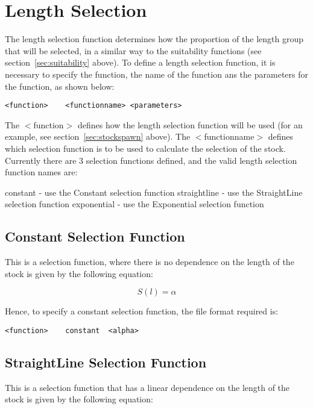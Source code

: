 \documentclass [a4paper, 10pt]{book}
\begin{document}
\section{Length Selection}\label{sec:lselection}
The length selection function determines how the proportion of the length group that will be selected, in a similar way to the suitability functions (see section~\ref{sec:suitability} above).  To define a length selection function, it is necessary to specify the function, the name of the function ans the parameters for the function, as shown below:

{\small\begin{verbatim}
<function>    <functionname> <parameters>
\end{verbatim}}

The $<$function$>$ defines how the length selection function will be used (for an example, see section~\ref{sec:stockspawn} above).  The $<$functionname$>$ defines which selection function is to be used to calculate the selection of the stock.  Currently there are 3 selection functions defined, and the valid length selection function names are:

\bigskip
constant - use the Constant selection function\newline
straightline - use the StraightLine selection function\newline
exponential - use the Exponential selection function

\subsection{Constant Selection Function}
This is a selection function, where there is no dependence on the length of the stock is given by the following equation:

\begin{equation}\label{eq:constsel}
S(l) = \alpha
\end{equation}

Hence, to specify a constant selection function, the file format required is:

{\small\begin{verbatim}
<function>    constant  <alpha>
\end{verbatim}}

\subsection{StraightLine Selection Function}
This is a selection function that has a linear dependence on the length of the stock is given by the following equation:
\end{document}
